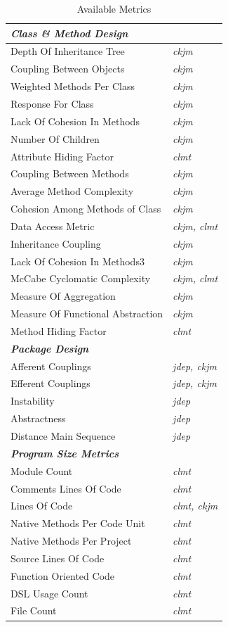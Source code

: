 \documentclass{sig-alternate}
\begin{document}
\begin{table}
\centering
\caption{Available Metrics}
\label{tbl:selected-metrics}
\begin{tabular}{l l}
 \hline
\multicolumn{2}{l}{\textit{\textbf{Class \& Method Design}}}\\
\hline
Depth Of Inheritance Tree & \textit{ckjm}\\
Coupling Between Objects & \textit{ckjm}\\
Weighted Methods Per Class & \textit{ckjm}\\
Response For Class & \textit{ckjm}\\
Lack Of Cohesion In Methods & \textit{ckjm}\\
Number Of Children & \textit{ckjm}\\
Attribute Hiding Factor & \textit{clmt}\\
Coupling Between Methods & \textit{ckjm}\\
Average Method Complexity & \textit{ckjm}\\
Cohesion Among Methods of Class & \textit{ckjm}\\
Data Access Metric & \textit{ckjm, clmt}\\
Inheritance Coupling & \textit{ckjm}\\
Lack Of Cohesion In Methods3 & \textit{ckjm}\\
McCabe Cyclomatic Complexity & \textit{ckjm, clmt}\\
Measure Of Aggregation & \textit{ckjm}\\
Measure Of Functional Abstraction & \textit{ckjm}\\
Method Hiding Factor & \textit{clmt}\\
\hline
\multicolumn{2}{l}{\textit{\textbf{Package Design}}}\\
\hline
Afferent Couplings & \textit{jdep, ckjm}\\
Efferent Couplings & \textit{jdep, ckjm}\\
Instability & \textit{jdep}\\
Abstractness & \textit{jdep}\\
Distance Main Sequence & \textit{jdep}\\
\hline
\multicolumn{2}{l}{\textit{\textbf{Program Size Metrics}}}\\
\hline
Module Count & \textit{clmt}\\
Comments Lines Of Code & \textit{clmt}\\
Lines Of Code & \textit{clmt, ckjm}\\
Native Methods Per Code Unit & \textit{clmt}\\
Native Methods Per Project & \textit{clmt}\\
Source Lines Of Code & \textit{clmt}\\
Function Oriented Code & \textit{clmt}\\
DSL Usage Count & \textit{clmt}\\
File Count & \textit{clmt}\\
\hline
\end{tabular}
\end{table}
\end{document}
